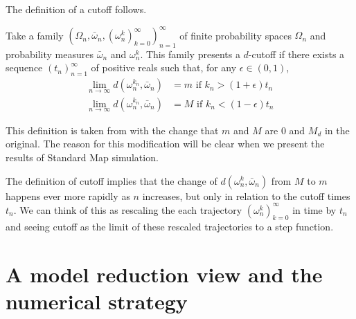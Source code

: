 The definition of a cutoff follows.
\begin{definition}[Cutoff]
\label{cutoffdefinitionn}
Take a family $(\Omega_n,\bar{\omega}_n,
(\omega^k_n)_{k=0}^{\infty})_{n=1}^{\infty}$ of finite probability
spaces $\Omega_n$ and probability measures $\bar{\omega}_n$ and
$\omega_n^k$. This family presents a $d$-cutoff if there exists a
sequence $(t_n)_{n=1}^{\infty}$ of positive reals such that, for any
$\epsilon \in (0,1)$,
\begin{subequations}
  \label{eqn:defn_cutoff}
  \begin{align}
    \label{eqn:defn_cutoff_1}
    \lim_{n \rightarrow \infty}d(\omega^{k_n}_n,\bar{\omega}_n) &= m \text{ if }
    k_n > (1+\epsilon)t_n \\
    \lim_{n \rightarrow \infty}d(\omega^{k_n}_n,\bar{\omega}_n) &= M \text{ if }
    k_n < (1-\epsilon)t_n
  \end{align}
\end{subequations}
\end{definition}




This definition is taken from \cite{Diaconis2005} with the change that
$m$ and $M$ are $0$ and $M_d$ in the original. The reason for this
modification will be clear when we present the results of Standard Map
simulation.

The definition of cutoff implies that the change of
$d(\omega_n^k,\bar{\omega}_n)$ from $M$ to $m$ happens ever more
rapidly as $n$ increases, but only in relation to the cutoff times
$t_n$. We can think of this as rescaling the each trajectory
$(\omega_n^k)_{k=0}^{\infty}$ in time by $t_n$ and seeing cutoff as
the limit of these rescaled trajectories to a step function.

\section{A model reduction view and the numerical strategy}
\label{sec:modelreduction}


